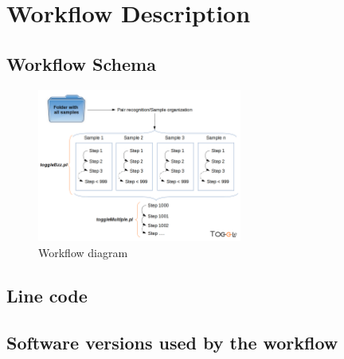 \documentclass[a4paper]{article}
\begin{document}





\tableofcontents
\newpage




\section{Workflow Description}

\subsection{Workflow Schema}

\begin{figure}[ht]
\centering
\includegraphics[width=0.6\textwidth]{togglePipeline.png}
\caption{\label{fig:worflow}Workflow diagram}
\end{figure}

\subsection{Line code}




\subsection{Software versions used by the workflow}


\end{document}
